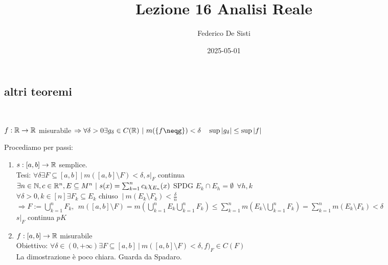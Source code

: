 \documentclass[12px]{article}
\title{Lezione 16 Analisi Reale}
\date{2025-05-01}
\author{Federico De Sisti}
\begin{document}
	\maketitle
	\newpage
	\subsection{altri teoremi}\\
	\begin{teo}[Lisin]
		$f:\mathbb{R} \rightarrow \mathbb{R}$ misurabile $ \Rightarrow \forall \delta > 0 \exists g_\delta \in C(\R)\ | \ m(\{f\neqg\})< \delta\ \ \ \sup |g_\delta|\leq \sup|f|$
	\end{teo}
	\begin{dimo}
		Procediamo per passi:
		\begin{enumerate}
			\item $s:[a,b] \rightarrow \mathbb{R}$ semplice.\\
				Tesi: $\forall \delta \exists F\subseteq[a,b]\ | \ m([a,b]\setminus F) < \delta, s|_F$ continua\\
				$\exists n\in \mathbb{N}, c\in\mathbb{R}^n, E\subseteq M^n\ | \ s(x) = \sum^{n}_{k = 1}c_k\chi_{E_n}(x)$ SPDG $E_k\cap E_h = \emptyset \ \ \forall h,k$ \\
				$\forall \delta > 0 , k\in[n]\exists F_k\subseteq E_k$ chiuso $\ | \ m(E_k\setminus F_k) < \frac\delta n$\\
				$\displaystyle \Rightarrow  F := \bigcup^{n}_{k=1}F_k, \ \ m([a,b]\setminus F) = m( \bigcup^{n}_{k=1}E_k \bigcup^{n}_{k=1}F_k) \leq \sum^{n}_{k=1}m(E_k\setminus \bigcup^{n}_{k=1}F_k) = \sum^{n}_{k=1}m(E_k\setminus F_k) < \delta$ \\
				$s|_F$ continua  $pK$
			\item $f:[a,b] \rightarrow \mathbb{R}$ misurabile\\
				Obiettivo: $\forall \delta\in (0,+\infty)\exists F\subseteq[a,b]\ | \ m([a,b]\setminus F) <\delta, f)_F\in C(F)$ \\
				La dimostrazione è poco chiara. Guarda da Spadaro.

		\end{enumerate}

	\end{dimo}
\end{document}
